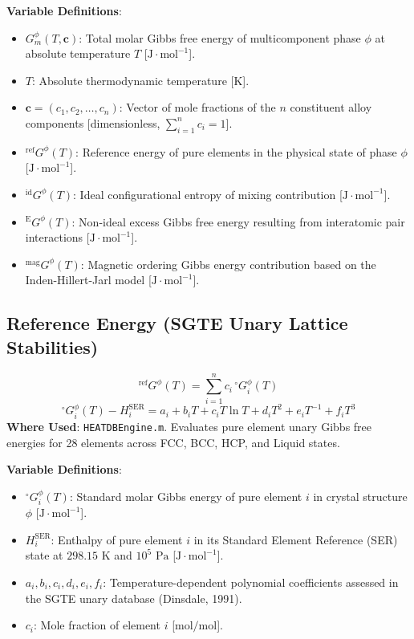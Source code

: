 \documentclass[11pt,a4paper]{article}
\begin{document}
\noindent\textbf{Variable Definitions}:
\begin{itemize}
  \item $G_m^\phi(T, \mathbf{c})$: Total molar Gibbs free energy of multicomponent phase $\phi$ at absolute temperature $T$ [$\text{J}\cdot\text{mol}^{-1}$].
  \item $T$: Absolute thermodynamic temperature [$\text{K}$].
  \item $\mathbf{c} = (c_1, c_2, \dots, c_n)$: Vector of mole fractions of the $n$ constituent alloy components [dimensionless, $\sum_{i=1}^n c_i = 1$].
  \item ${^{\text{ref}}}G^\phi(T)$: Reference energy of pure elements in the physical state of phase $\phi$ [$\text{J}\cdot\text{mol}^{-1}$].
  \item ${^{\text{id}}}G^\phi(T)$: Ideal configurational entropy of mixing contribution [$\text{J}\cdot\text{mol}^{-1}$].
  \item ${^{\text{E}}}G^\phi(T)$: Non-ideal excess Gibbs free energy resulting from interatomic pair interactions [$\text{J}\cdot\text{mol}^{-1}$].
  \item ${^{\text{mag}}}G^\phi(T)$: Magnetic ordering Gibbs energy contribution based on the Inden-Hillert-Jarl model [$\text{J}\cdot\text{mol}^{-1}$].
\end{itemize}

\subsection{Reference Energy (SGTE Unary Lattice Stabilities)}
\begin{equation}
{^{\text{ref}}}G^\phi(T) = \sum_{i=1}^n c_i \, {^\circ}G_i^\phi(T)
\end{equation}
\begin{equation}
{^\circ}G_i^\phi(T) - H_i^{\text{SER}} = a_i + b_i T + c_i T \ln T + d_i T^2 + e_i T^{-1} + f_i T^3
\end{equation}
\textbf{Where Used}: \texttt{HEATDBEngine.m}. Evaluates pure element unary Gibbs free energies for 28 elements across FCC, BCC, HCP, and Liquid states.

\noindent\textbf{Variable Definitions}:
\begin{itemize}
  \item ${^\circ}G_i^\phi(T)$: Standard molar Gibbs energy of pure element $i$ in crystal structure $\phi$ [$\text{J}\cdot\text{mol}^{-1}$].
  \item $H_i^{\text{SER}}$: Enthalpy of pure element $i$ in its Standard Element Reference (SER) state at $298.15\text{ K}$ and $10^5\text{ Pa}$ [$\text{J}\cdot\text{mol}^{-1}$].
  \item $a_i, b_i, c_i, d_i, e_i, f_i$: Temperature-dependent polynomial coefficients assessed in the SGTE unary database (Dinsdale, 1991).
  \item $c_i$: Mole fraction of element $i$ [$\text{mol/mol}$].
\end{itemize}
\end{document}
